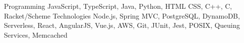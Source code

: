 
\begin{cvskills}
  \cvskill
    {Programming} %
    {
    	    JavaScript,
    	    TypeScript,
        Java,
    	    Python,
   	    HTML CSS,
    	    C++,
    	    C,
    	    Racket/Scheme
    } %
  \cvskill
    {Technologies} %
    {
		Node.js,
		Spring MVC,
		PostgreSQL,
		DynamoDB,
		Serverless,		
		React,
		AngularJS,
		Vue.js, 
		AWS,
 		Git,
		JUnit, 
		Jest,
		POSIX,
		Queuing Services,
		Memcached
    } %

\end{cvskills}
